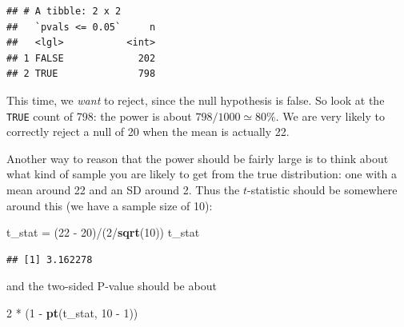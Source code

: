\documentclass[]{tufte-book}
\newenvironment{Shaded}{}{}
\newcommand{\DataTypeTok}[1]{\textcolor[rgb]{0.56,0.13,0.00}{#1}}
\newcommand{\DecValTok}[1]{\textcolor[rgb]{0.25,0.63,0.44}{#1}}
\newcommand{\FloatTok}[1]{\textcolor[rgb]{0.25,0.63,0.44}{#1}}
\newcommand{\KeywordTok}[1]{\textcolor[rgb]{0.00,0.44,0.13}{\textbf{#1}}}
\newcommand{\NormalTok}[1]{#1}
\newcommand{\OperatorTok}[1]{\textcolor[rgb]{0.40,0.40,0.40}{#1}}
\newcommand{\StringTok}[1]{\textcolor[rgb]{0.25,0.44,0.63}{#1}}
\theoremstyle{definition}
\theoremstyle{definition}
\theoremstyle{definition}
\theoremstyle{remark}
\begin{document}
\begin{Shaded}
\end{Shaded}

\begin{verbatim}
## # A tibble: 2 x 2
##   `pvals <= 0.05`     n
##   <lgl>           <int>
## 1 FALSE             202
## 2 TRUE              798
\end{verbatim}

This time, we \emph{want} to reject, since the null hypothesis is false.
So look at the \texttt{TRUE} count of 798: the power is about
\(798/1000 \simeq 80\%\). We are very likely to correctly reject a null
of 20 when the mean is actually 22.

Another way to reason that the power should be fairly large is to think
about what kind of sample you are likely to get from the true
distribution: one with a mean around 22 and an SD around 2. Thus the
\(t\)-statistic should be somewhere around this (we have a sample size
of 10):

\begin{Shaded}
\begin{Highlighting}[]
\NormalTok{t_stat =}\StringTok{ }\NormalTok{(}\DecValTok{22} \OperatorTok{-}\StringTok{ }\DecValTok{20}\NormalTok{)}\OperatorTok{/}\NormalTok{(}\DecValTok{2}\OperatorTok{/}\KeywordTok{sqrt}\NormalTok{(}\DecValTok{10}\NormalTok{))}
\NormalTok{t_stat}
\end{Highlighting}
\end{Shaded}

\begin{verbatim}
## [1] 3.162278
\end{verbatim}

and the two-sided P-value should be about

\begin{Shaded}
\begin{Highlighting}[]
\DecValTok{2} \OperatorTok{*}\StringTok{ }\NormalTok{(}\DecValTok{1} \OperatorTok{-}\StringTok{ }\KeywordTok{pt}\NormalTok{(t_stat, }\DecValTok{10} \OperatorTok{-}\StringTok{ }\DecValTok{1}\NormalTok{))}
\end{Highlighting}
\end{Shaded}
\end{document}
